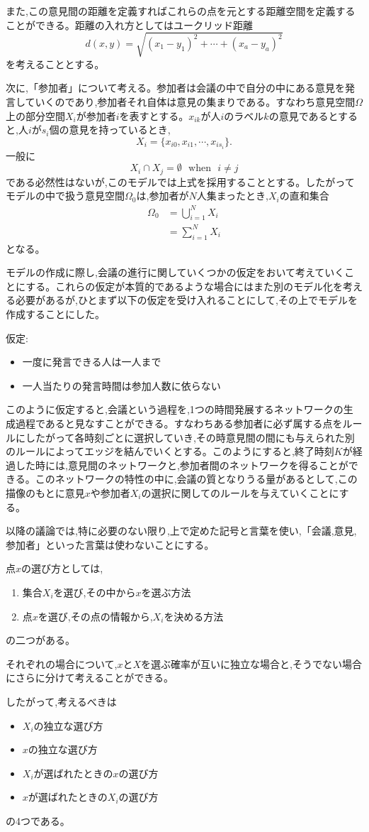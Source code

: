 また,この意見間の距離を定義すればこれらの点を元とする距離空間を定義することができる。距離の入れ方としてはユークリッド距離
\[d(x, y) = \sqrt{(x_{1} - y_{1})^{2} + \cdots + (x_{a} - y_{a})^{2}}\]
を考えることとする。

次に,「参加者」について考える。参加者は会議の中で自分の中にある意見を発言していくのであり,参加者それ自体は意見の集まりである。すなわち意見空間$\Omega$上の部分空間$X_{i}$が参加者$i$を表すとする。$x_{ik}$が人$i$のラベル$k$の意見であるとすると,人$i$が$s_{i}$個の意見を持っているとき,
\[X_{i} = \{x_{i0}, x_{i1}, \cdots , x_{is_{i}}\}.\]
一般に
\[X_{i}\cap X_{j} = \emptyset\ \ \  \text{when}\ \ \ i \neq j\]
である必然性はないが,このモデルでは上式を採用することとする。したがってモデルの中で扱う意見空間$\Omega_{0}$は,参加者が$N$人集まったとき,$X_{i}$の直和集合
\begin{align}\Omega_{0} &= \bigcup_{i = 1}^{N} X_{i} \nonumber \\
&= \sum_{i=1}^{N} X_{i} \end{align}
となる。

モデルの作成に際し,会議の進行に関していくつかの仮定をおいて考えていくことにする。これらの仮定が本質的であるような場合にはまた別のモデル化を考える必要があるが,ひとまず以下の仮定を受け入れることにして,その上でモデルを作成することにした。

仮定:
\begin{itemize}
    \item 一度に発言できる人は一人まで
    \item 一人当たりの発言時間は参加人数に依らない
\end{itemize}

このように仮定すると,会議という過程を,1つの時間発展するネットワークの生成過程であると見なすことができる。すなわちある参加者に必ず属する点をルールにしたがって各時刻ごとに選択していき,その時意見間の間にも与えられた別のルールによってエッジを結んでいくとする。このようにすると,終了時刻$K$が経過した時には,意見間のネットワークと,参加者間のネットワークを得ることができる。このネットワークの特性の中に,会議の質となりうる量があるとして,この描像のもとに意見$x$や参加者$X_{i}$の選択に関してのルールを与えていくことにする。

以降の議論では,特に必要のない限り,上で定めた記号と言葉を使い,「会議,意見,参加者」といった言葉は使わないことにする。

点$x$の選び方としては,
\begin{enumerate}
    \item 集合$X_{i}$を選び,その中から$x$を選ぶ方法
    \item 点$x$を選び,その点の情報から,$X_{i}$を決める方法
\end{enumerate}
の二つがある。

それぞれの場合について,$x$と$X$を選ぶ確率が互いに独立な場合と,そうでない場合にさらに分けて考えることができる。

したがって,考えるべきは
\begin{itemize}
    \item $X_{i}$の独立な選び方
    \item $x$の独立な選び方
    \item $X_{i}$が選ばれたときの$x$の選び方
    \item $x$が選ばれたときの$X_{i}$の選び方
\end{itemize}
の4つである。
